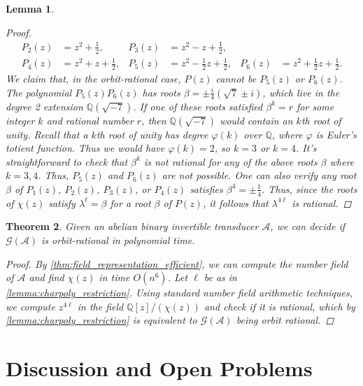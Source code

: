 \documentclass[12pt, letterpaper]{article}
\newcommand{\Q}{\mathbb Q}
\newcommand{\A}{\mathcal A}
\newcommand{\gp}{\mathcal G}
\newtheorem{thm}{Theorem}[section]
\newtheorem{lemma}[thm]{Lemma}
\begin{document}
\begin{lemma}
\begin{proof}
\begin{align*}
            P_2(z) &= z^2 + \frac{1}{2}, &
            P_3(z) &= z^2 - z + \frac{1}{2},\\
            P_4(z) &= z^2 + z + \frac{1}{2}, &
            P_5(z) &= z^2 - \frac{1}{2} z + \frac{1}{2}, &
            P_6(z) &= z^2 + \frac{1}{2} z + \frac{1}{2}.
        \end{align*}
        We claim that, in the orbit-rational case, $P(z)$ cannot be $P_5(z)$ or
        $P_6(z)$.  The polynomial $P_5(z)P_6(z)$ has roots $\beta = \pm
        \frac{i}{4} (\sqrt{7} \pm i)$, which live in the degree 2 extension
        $\Q(\sqrt{-7})$. If one of these roots satisfied $\beta^k = r$ for some
        integer $k$ and rational number $r$, then $\Q(\sqrt{-7})$ would contain
        an $k$th root of unity. Recall that a $k$th root of unity has degree
        $\varphi(k)$ over $\Q$, where $\varphi$ is Euler's totient function.
        Thus we would have $\varphi(k) = 2$, so $k = 3$ or $k = 4$. It's
        straightforward to check that $\beta^k$ is not rational for any of the
        above roots $\beta$ where $k = 3,4$.  Thus, $P_5(z)$ and $P_6(z)$ are
        not possible. One can also verify any root $\beta$ of $P_1(z)$,
        $P_2(z)$, $P_3(z)$, or $P_4(z)$ satisfies $\beta^4 = \pm \frac{1}{4}$.
        Thus, since the roots of $\chi(z)$ satisfy $\lambda^\ell = \beta$ for a
        root $\beta$ of $P(z)$, it follows that $\lambda^{4\ell}$ is rational.
    \end{proof}
\end{lemma}

\begin{thm}\label{thm:orbit_algorithm}
    Given an abelian binary invertible transducer $\A$, we can decide if
    $\gp(\A)$ is orbit-rational in polynomial time.
    \begin{proof}
        By \cref{thm:field_representation_efficient}, we can compute the
        number field of $\A$ and find $\chi(z)$ in time $O(n^6)$.  Let $\ell$
        be as in \cref{lemma:charpoly_restriction}. Using standard number field
        arithmetic techniques, we compute $z^{4 \ell}$ in the field $\Q[z] /
        (\chi(z))$ and check if it is rational, which by
        \cref{lemma:charpoly_restriction} is equivalent to $\gp(\A)$ being
        orbit rational.
    \end{proof}
\end{thm}

\section{Discussion and Open Problems}
\end{document}
